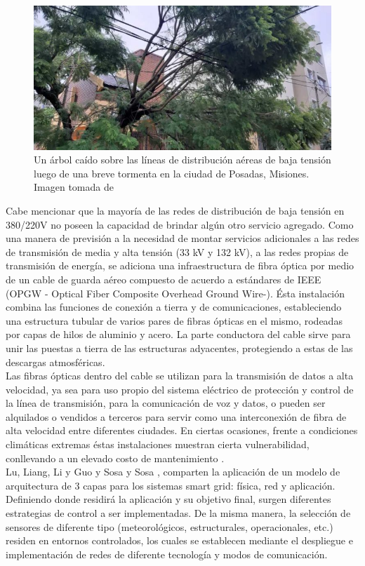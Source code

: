 \begin{figure}[h!]
	\centering
	\includegraphics[width=0.9\linewidth]{Figures/arbol_caido_linea_bt}
	\caption{Un árbol caído sobre las líneas de distribución aéreas de baja tensión luego de una breve tormenta en la ciudad de Posadas, Misiones. Imagen tomada de \citep{Noticia_MNES}}
	\label{fig:arbolcaidolineabt}
\end{figure}
Cabe mencionar que la mayoría de las redes de distribución de baja tensión en 380/220V no poseen la capacidad de brindar algún otro servicio agregado. Como una manera de previsión a la necesidad de montar servicios adicionales a las redes de transmisión de media y alta tensión (33 kV y 132 kV), a las redes propias de transmisión de energía, se adiciona una infraestructura de fibra óptica por medio de un cable de guarda aéreo compuesto de acuerdo a estándares de IEEE (OPGW - Optical Fiber Composite Overhead Ground Wire-). Ésta instalación combina las funciones de conexión a tierra y de comunicaciones, estableciendo una estructura tubular de varios pares de fibras ópticas en el mismo, rodeadas por capas de hilos de aluminio y acero. La parte conductora del cable sirve para unir las puestas a tierra de las estructuras adyacentes, protegiendo a estas de las descargas atmosféricas.\\
Las fibras ópticas dentro del cable se utilizan para la transmisión de datos a alta velocidad, ya sea para uso propio del sistema eléctrico de protección y control de la línea de transmisión, para la comunicación de voz y datos, o pueden ser alquilados o vendidos a terceros para servir como una interconexión de fibra de alta velocidad entre diferentes ciudades. En ciertas ocasiones, frente a condiciones climáticas extremas éstas instalaciones muestran cierta vulnerabilidad, conllevando a un elevado costo de mantenimiento \citep{ARTICLE:1}.\\
Lu, Liang, Li y Guo \citep{ARTICLE:1} y Sosa y Sosa \citep{ARTICLE:2}, comparten la aplicación de un modelo de arquitectura de 3 capas para los sistemas smart grid: física, red y aplicación. Definiendo donde residirá la aplicación y su objetivo final, surgen diferentes estrategias de control a ser implementadas. De la misma manera, la selección de sensores de diferente tipo (meteorológicos, estructurales, operacionales, etc.) residen en entornos controlados, los cuales se establecen mediante el despliegue e implementación de redes de diferente tecnología y modos de comunicación.\\
